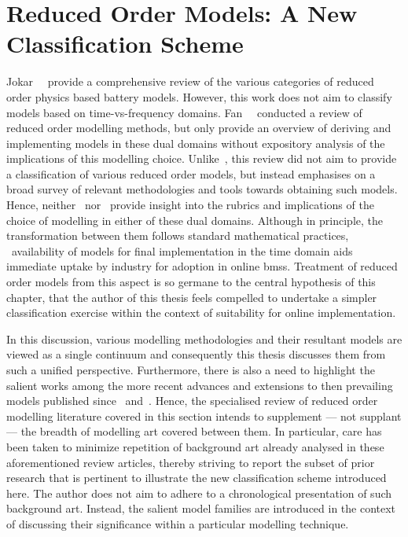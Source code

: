 \section{Reduced Order Models: A New Classification Scheme}\label{sec:classificationscheme}

Jokar~\etal~\cite{Jokar2016}  provide  a  comprehensive review  of  the  various
categories  of  reduced  order  physics  based  battery  models.  However,  this
work  does  not aim  to  classify  models  based on  time-vs-frequency  domains.
Fan~\etal{}~\cite{Fan2015}  conducted  a  review   of  reduced  order  modelling
methods, but  only provide an  overview of  deriving and implementing  models in
these  dual domains  without expository  analysis  of the  implications of  this
modelling choice. Unlike~\cite{Jokar2016}, this review  did not aim to provide a
classification  of various  reduced order  models, but  instead emphasises  on a
broad survey of relevant methodologies  and tools towards obtaining such models.
Hence,  neither~\cite{Jokar2016}  nor~\cite{Fan2015}  provide insight  into  the
rubrics and  implications of  the choice  of modelling in  either of  these dual
domains. Although in principle, the transformation between them follows standard
mathematical  practices, ~availability of  models for
final implementation  in the time domain  aids immediate uptake by  industry for
adoption  in online  \gls{bms}s. Treatment  of  reduced order  models from  this
aspect  is so  germane to  the central  hypothesis of  this chapter, that  the author  of this  thesis feels
compelled to undertake  a simpler classification exercise within  the context of
suitability for online implementation.


In this discussion,  various modelling methodologies and  their resultant models
are viewed  as a single  continuum and  consequently this thesis  discusses them
from such a unified perspective. Furthermore,  there is also a need to highlight
the  salient  works among  the  more  recent  advances  and extensions  to  then
prevailing  models published  since~\cite{Jokar2016} and~\cite{Fan2015}.  Hence,
the specialised  review of  reduced order modelling  literature covered  in this
section intends to supplement --- not  supplant --- the breadth of modelling art
covered between them. In particular, care  has been taken to minimize repetition
of  background art  already analysed  in these  aforementioned review  articles,
thereby striving  to report the  subset of prior  research that is  pertinent to
illustrate the  new classification scheme  introduced here. The author  does not
aim to adhere  to a chronological presentation of such  background art. Instead,
the salient  model families are  introduced in  the context of  discussing their
significance within a particular modelling technique.



